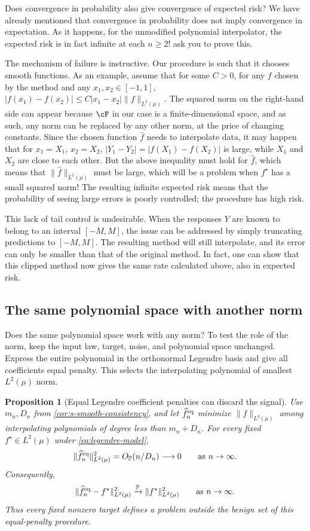 \documentclass[11pt,twoside]{article}
\renewcommand{\P}{\mathbb P}
\newtheorem{proposition}[theorem]{Proposition}
\theoremstyle{definition}
\theoremstyle{remark}
\begin{document}
Does convergence in probability also give convergence of expected risk? 
We have already mentioned that convergence in probability does not imply convergence in expectation.
As it happens, for
the unmodified polynomial interpolator, the expected risk is  in fact 
infinite at each
$n\ge2$!  ask you to prove this.

The mechanism of failure is instructive. 
Our procedure is such that it chooses smooth functions.
As an example, assume that for some $C>0$, for any $f$ chosen by the method
and any $x_1,x_2\in [-1,1]$, $|f(x_1)-f(x_2)| \le C |x_1-x_2| \| f\|_{L^2(\mu)}$.
The squared norm on the right-hand side can appear because $\cF$ in our
case is a finite-dimensional space, and as such, any norm can be replaced
by any other norm, at the price of changing constants.
Since the chosen function $\widehat f$ needs to interpolate data,
it may happen that for $x_1 = X_1$, $x_2 = X_2$, $|Y_1-Y_2| = |f(X_1)-f(X_2)|$ is large,
while $X_1$ and $X_2$ are close to each other. But the above inequality must hold
for $\widehat f$, which means that $\|\widehat f\|_{L^2(\mu)}$ must be large,
which will be a problem when $f^\star$ has a small squared norm!
The resulting infinite expected risk
means that the probability of seeing large errors is poorly controlled; the procedure
has high risk.

This lack of tail control is undesirable. When the responses $Y$ are known to
belong to an interval $[-M,M]$,
the issue can be addressed by simply truncating predictions to $[-M,M]$.
The resulting method will still interpolate, and its error can only be smaller
than that of the original method. In fact, one can show that this clipped method
now gives the same rate calculated above, also in expected risk.

\subsection{The same polynomial space with another norm}

Does the same polynomial space work with any norm? To test the role of the
norm, keep the input law, target, noise, and polynomial space unchanged.
Express the entire polynomial in the orthonormal Legendre basis and give all
coefficients equal penalty. This selects the interpolating polynomial of
smallest $L^2(\mu)$ norm.

\begin{proposition}[Equal Legendre coefficient penalties can discard the signal]
\label{prop:equal-penalty}
Use $m_n,D_n$ from \cref{cor:s-smooth-consistency}, and let
$\widehat f_n^{\rm eq}$ minimize $\|f\|_{L^2(\mu)}$ among interpolating
polynomials of degree less than $m_n+D_n$. For every fixed
$f^\star\in L^2(\mu)$ under \cref{eq:legendre-model},
\[
 \|\widehat f_n^{\rm eq}\|_{L^2(\mu)}^2
 =O_{\P}(n/D_n)\longrightarrow0
 \qquad\text{as }n\to\infty.
\]
Consequently,
\[
 \|\widehat f_n^{\rm eq}-f^\star\|_{L^2(\mu)}^2
 \xrightarrow{\P}\|f^\star\|_{L^2(\mu)}^2
 \qquad\text{as }n\to\infty.
\]
Thus every fixed nonzero target defines a problem outside the benign set of
this equal-penalty procedure.
\end{proposition}
\end{document}
